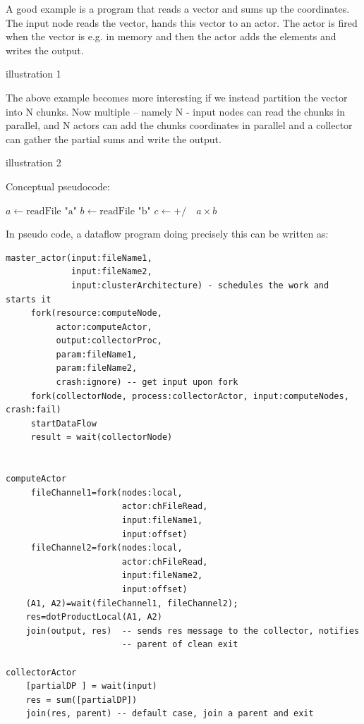 \documentclass[11pt,a4paper]{article}
\begin{document}
\begin{Example}

A good example is a program that reads a vector and sums up the
 coordinates.  The input node reads the vector, hands this vector to
  an actor.  The actor is fired when the vector is e.g. in memory and
  then the actor adds the elements and writes the output.

illustration 1

The above example becomes more interesting if we instead partition the
vector into N chunks. Now multiple – namely N - input nodes can read
the chunks in parallel, and N actors can add the chunks coordinates in
parallel and a collector can gather the partial sums and write the
output.

illustration 2

Conceptual pseudocode:
\begin{algorithmic}
  \State $a\gets \textrm{readFile "a"}$
  \State $b\gets \textrm{readFile "b"}$
  \State $c\gets  \textrm{+/} \quad a\times b$
\end{algorithmic}

In pseudo code, a dataflow program doing precisely this can be written as:
\begin{lstlisting}
master_actor(input:fileName1, 
             input:fileName2, 
             input:clusterArchitecture) - schedules the work and starts it
     fork(resource:computeNode, 
          actor:computeActor, 
          output:collectorProc,
          param:fileName1, 
          param:fileName2, 
          crash:ignore) -- get input upon fork
     fork(collectorNode, process:collectorActor, input:computeNodes, crash:fail)
     startDataFlow
     result = wait(collectorNode)


computeActor
     fileChannel1=fork(nodes:local, 
                       actor:chFileRead, 
                       input:fileName1,
                       input:offset)
     fileChannel2=fork(nodes:local, 
                       actor:chFileRead, 
                       input:fileName2,
                       input:offset)
    (A1, A2)=wait(fileChannel1, fileChannel2);
    res=dotProductLocal(A1, A2)
    join(output, res)  -- sends res message to the collector, notifies
                       -- parent of clean exit

collectorActor
    [partialDP ] = wait(input)
    res = sum([partialDP])
    join(res, parent) -- default case, join a parent and exit

\end{lstlisting}


\end{Example}
\end{document}
